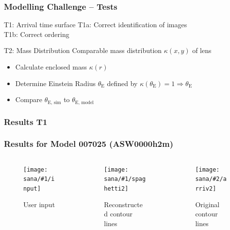 \documentclass[aspectratio=1610]{beamer}
\newcommand{\resframea}[2]{
\begin{frame}
  \frametitle{Results for Model #1 (#2)}
  \begin{columns}[T]\begin{column}{0.33\textwidth}
    \begin{figure}
      \texttt{[image: sana/\#1/input]}
      \caption{User input}
    \end{figure}
  \end{column}\begin{column}{0.33\textwidth}
    \begin{figure}
      \texttt{[image: sana/\#1/spaghetti2]}
      \caption{Reconstructed contour lines}
    \end{figure}
  \end{column}\begin{column}{0.33\textwidth}
    \begin{figure}
      \texttt{[image: sana/\#2/arriv2]}
      \caption{Original contour lines}
    \end{figure}
  \end{column}\end{columns}
\end{frame}
}
\begin{document}
\begin{frame}
  \frametitle{Modelling Challenge -- Tests}
  \begin{block}{T1: Arrival time surface}
    T1a: Correct identification of images\\
    T1b: Correct ordering
  \end{block}
  
  \begin{block}{T2: Mass Distribution}
    Comparable mass distribution $\kappa\left(x,y\right)$ of lens\\
  \end{block}
  
  \begin{itemize}
    \item Calculate enclosed mass $\kappa\left(r\right)$
    \item Determine Einstein Radius $\theta_\text{E}$ defined by $\kappa\left(\theta_\text{E}\right)=1\Rightarrow\theta_\text{E}$
    \item Compare $\theta_\text{E, sim}$ to $\theta_\text{E, model}$
  \end{itemize}

\end{frame}



\begin{frame}
  \frametitle{Results T1}
  
\end{frame}

\resframea{007025}{ASW0000h2m}
\end{document}
